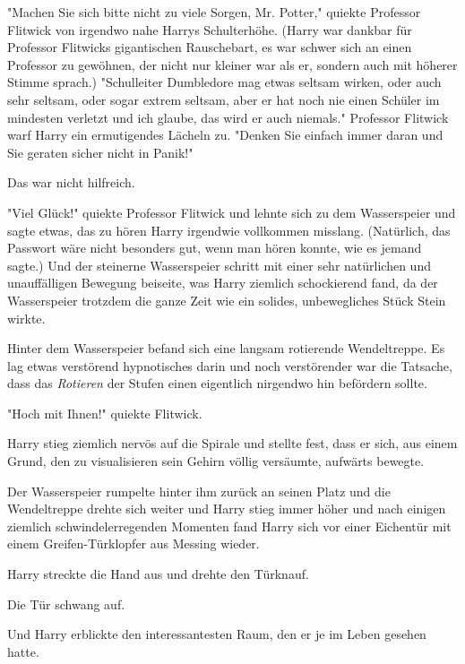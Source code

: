 {"Machen Sie sich bitte nicht zu viele Sorgen, Mr. Potter," quiekte Professor Flitwick von irgendwo nahe Harrys Schulterhöhe. (Harry war dankbar für Professor Flitwicks gigantischen Rauschebart, es war schwer sich an einen Professor zu gewöhnen, der nicht nur kleiner war als er, sondern auch mit höherer Stimme sprach.) "Schulleiter Dumbledore mag etwas seltsam wirken, oder auch sehr seltsam, oder sogar extrem seltsam, aber er hat noch nie einen Schüler im mindesten verletzt und ich glaube, das wird er auch niemals." Professor Flitwick warf Harry ein ermutigendes Lächeln zu. "Denken Sie einfach immer daran und Sie geraten sicher nicht in Panik!"

Das war nicht hilfreich.

"Viel Glück!" quiekte Professor Flitwick und lehnte sich zu dem Wasserspeier und sagte etwas, das zu hören Harry irgendwie vollkommen misslang. (Natürlich, das Passwort wäre nicht besonders gut, wenn man hören konnte, wie es jemand sagte.) Und der steinerne Wasserspeier schritt mit einer sehr natürlichen und unauffälligen Bewegung beiseite, was Harry ziemlich schockierend fand, da der Wasserspeier trotzdem die ganze Zeit wie ein solides, unbewegliches Stück Stein wirkte.

Hinter dem Wasserspeier befand sich eine langsam rotierende Wendeltreppe. Es lag etwas verstörend hypnotisches darin und noch verstörender war die Tatsache, dass das \emph{Rotieren} der Stufen einen eigentlich nirgendwo hin befördern sollte.

"Hoch mit Ihnen!" quiekte Flitwick.

Harry stieg ziemlich nervös auf die Spirale und stellte fest, dass er sich, aus einem Grund, den zu visualisieren sein Gehirn völlig versäumte, aufwärts bewegte.

Der Wasserspeier rumpelte hinter ihm zurück an seinen Platz und die Wendeltreppe drehte sich weiter und Harry stieg immer höher und nach einigen ziemlich schwindelerregenden Momenten fand Harry sich vor einer Eichentür mit einem Greifen-Türklopfer aus Messing wieder.

Harry streckte die Hand aus und drehte den Türknauf.

Die Tür schwang auf.

Und Harry erblickte den interessantesten Raum, den er je im Leben gesehen hatte.

}
